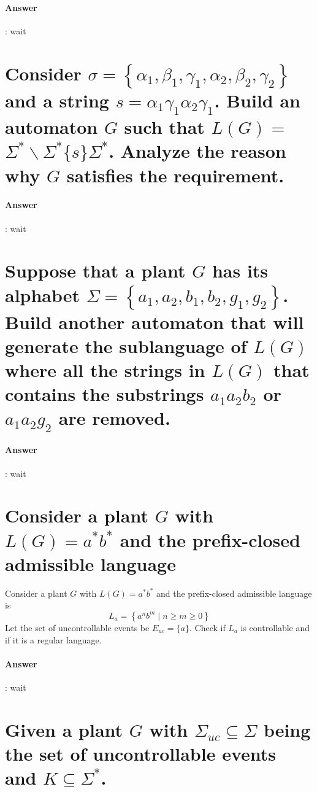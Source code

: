 \documentclass{article}
\begin{document}
\paragraph{Answer}:
wait

\section{Consider $\sigma=\left\{\alpha_1, \beta_1, \gamma_1, \alpha_2, \beta_2, \gamma_2\right\}$ and a string $s=\alpha_1 \gamma_1 \alpha_2 \gamma_1$. Build an automaton $G$ such that $L(G)=$ $\Sigma^* \backslash \Sigma^*\{s\} \Sigma^*$. Analyze the reason why $G$ satisfies the requirement.}

\paragraph{Answer}:
wait

\section{Suppose that a plant $G$ has its alphabet $\Sigma=\left\{a_1, a_2, b_1, b_2, g_1, g_2\right\}$. Build another automaton that will generate the sublanguage of $L(G)$ where all the strings in $L(G)$ that contains the substrings $a_1 a_2 b_2$ or $a_1 a_2 g_2$ are removed.}

\paragraph{Answer}:
wait

\section{Consider a plant $G$ with $L(G)=a^* b^*$ and the prefix-closed admissible language}

Consider a plant $G$ with $L(G)=a^* b^*$ and the prefix-closed admissible language is
$$
L_a=\left\{a^n b^m \mid n \geq m \geq 0\right\}
$$
Let the set of uncontrollable events be $E_{u c}=\{a\}$. Check if $L_a$ is controllable and if it is a regular language.

\paragraph{Answer}:
wait

\section{Given a plant $G$ with $\Sigma_{u c} \subseteq \Sigma$ being the set of uncontrollable events and $K \subseteq \Sigma^*$.}
 
\end{document}
